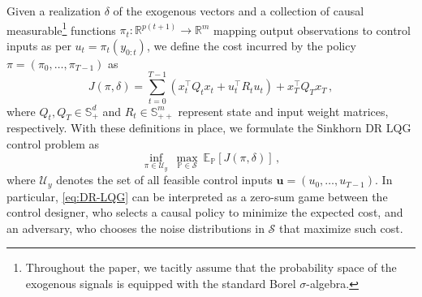 \documentclass[letterpaper, 10 pt, conference]{ieeeconf}  %
\theoremstyle{ieeeconf}
\newcommand{\inp}{\boldsymbol{u}}
\newcommand{\R}{\mathbb{R}}
\newcommand{\Prob}{\mathbb{P}}
\newcommand{\Symm}{\mathbb{S}}
\begin{document}
Given a realization $\delta$ of the exogenous vectors and a collection of causal measurable\footnote{Throughout the paper, we tacitly assume that the probability space of the exogenous signals is equipped with the standard Borel $\sigma$-algebra.} functions $\pi_t:\R^{p(t+1)}\rightarrow\R^m$ mapping output observations to control inputs as per $u_t = \pi_t(y_{0:t})$, we define the cost incurred by the policy $\pi = (\pi_0, \dots, \pi_{T-1})$ as%
\begin{equation*}
    J(\pi, \delta) = \sum_{t=0}^{T-1} (x_t^\top Q_t x_t + u_t^\top R_t u_t) + x_T^\top Q_T x_T\,,
\end{equation*}
where $Q_t, Q_T \in \Symm^d_+$ and $R_t\in\Symm^m_{++}$ represent state and input weight matrices, respectively. With these definitions in place, we formulate the Sinkhorn DR LQG control problem as
\begin{equation}
\label{eq:DR-LQG}
    \inf _{\pi\in\mathcal{U}_y}\ \max_{\mathbb{P} \in \mathcal{S}} \ \mathbb{E}_{\Prob}[J(\pi, \delta)]\,,
\end{equation}
where $\mathcal{U}_y$ denotes the set of all feasible control inputs $ \inp =(u_0, \dots, u_{T-1})$. In particular, \eqref{eq:DR-LQG} can be interpreted as a zero-sum game between the control designer, who selects a causal policy to minimize the expected cost, and an adversary, who chooses the noise distributions in $\mathcal{S}$ that maximize such cost. %




\end{document}
